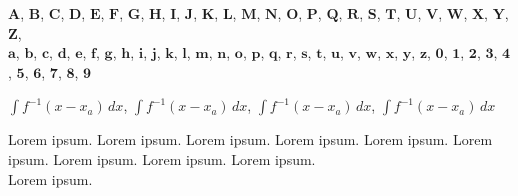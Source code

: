 \documentclass[a4paper,11pt]{article}
\begin{document}
\vspace{1em}





\noindent
$\mathbf{A}$, $\mathbf{B}$, $\mathbf{C}$, $\mathbf{D}$, $\mathbf{E}$,
$\mathbf{F}$, $\mathbf{G}$, $\mathbf{H}$, $\mathbf{I}$, $\mathbf{J}$,
$\mathbf{K}$, $\mathbf{L}$, $\mathbf{M}$, $\mathbf{N}$, $\mathbf{O}$,
$\mathbf{P}$, $\mathbf{Q}$, $\mathbf{R}$, $\mathbf{S}$, $\mathbf{T}$,
$\mathbf{U}$, $\mathbf{V}$, $\mathbf{W}$, $\mathbf{X}$, $\mathbf{Y}$,
$\mathbf{Z}$, \\
$\mathbf{a}$, $\mathbf{b}$, $\mathbf{c}$, $\mathbf{d}$, $\mathbf{e}$,
$\mathbf{f}$, $\mathbf{g}$, $\mathbf{h}$, $\mathbf{i}$, $\mathbf{j}$,
$\mathbf{k}$, $\mathbf{l}$, $\mathbf{m}$, $\mathbf{n}$, $\mathbf{o}$,
$\mathbf{p}$, $\mathbf{q}$, $\mathbf{r}$, $\mathbf{s}$, $\mathbf{t}$,
$\mathbf{u}$, $\mathbf{v}$, $\mathbf{w}$, $\mathbf{x}$, $\mathbf{y}$,
$\mathbf{z}$, \quad
$\mathbf{0}$, $\mathbf{1}$, $\mathbf{2}$, $\mathbf{3}$, $\mathbf{4}$,
$\mathbf{5}$, $\mathbf{6}$, $\mathbf{7}$, $\mathbf{8}$, $\mathbf{9}$

\vspace{1em}





\noindent
${ \scriptscriptstyle \int f^{ -1 }( x - x_{ a } ) \, dx }$,
${ \scriptstyle \int f^{ -1 }( x - x_{ a } ) \, dx }$,
${ \textstyle \int f^{ -1 }( x - x_{ a } ) \, dx }$,
${ \displaystyle \int f^{ -1 }( x - x_{ a } ) \, dx }$

\vspace{1em}





\noindent
{ \tiny Lorem ipsum. } { \scriptsize Lorem ipsum. }
{ \footnotesize Lorem ipsum. } { \small Lorem ipsum. }
{ \normalsize Lorem ipsum. } { \large Lorem ipsum. }
{ \Large Lorem ipsum. } { \LARGE Lorem ipsum. }
{ \huge Lorem ipsum. } \\
{ \Huge Lorem ipsum. }
\end{document}
